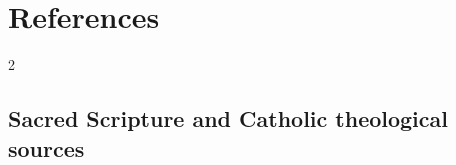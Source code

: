 \section{References}

\begingroup
\setlength{\parskip}{0.15em}
\titlespacing*{\subsection}{0pt}{1.35ex}{0.45ex}
\begin{multicols}{2}
\raggedcolumns

\subsection*{Sacred Scripture and Catholic theological sources}


\end{multicols}
